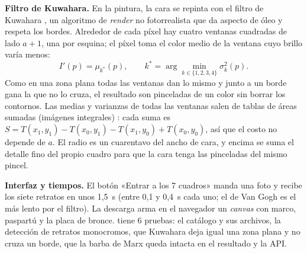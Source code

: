 \textbf{Filtro de Kuwahara.} En la pintura, la cara se repinta con el filtro de Kuwahara \cite{kuwahara1976}, un algoritmo de \emph{render} no fotorrealista que da aspecto de óleo y respeta los bordes. Alrededor de cada píxel hay cuatro ventanas cuadradas de lado $a+1$, una por esquina; el píxel toma el color medio de la ventana cuyo brillo varía menos:
\begin{equation}
  I'(p) = \mu_{k^\ast}(p), \qquad k^\ast = \arg\min_{k\in\{1,2,3,4\}} \sigma^2_k(p).
\end{equation}
Como en una zona plana todas las ventanas dan lo mismo y junto a un borde gana la que no lo cruza, el resultado son pinceladas de un color sin borrar los contornos. Las medias y varianzas de todas las ventanas salen de tablas de áreas sumadas (imágenes integrales) \cite{crow1984}: cada suma es $S = T(x_1,y_1) - T(x_0,y_1) - T(x_1,y_0) + T(x_0,y_0)$, así que el costo no depende de $a$. El radio es un cuarentavo del ancho de cara, y encima se suma el detalle fino del propio cuadro para que la cara tenga las pinceladas del mismo pincel.

\textbf{Interfaz y tiempos.} El botón «Entrar a los 7 cuadros» manda una foto y recibe los siete retratos en unos 1,5~s (entre 0,1 y 0,4~s cada uno; el de Van Gogh es el más lento por el filtro). La descarga arma en el navegador un \emph{canvas} con marco, paspartú y la placa de bronce.  tiene 6 pruebas: el catálogo y sus archivos, la detección de retratos monocromos, que Kuwahara deja igual una zona plana y no cruza un borde, que la barba de Marx queda intacta en el resultado y la API.
